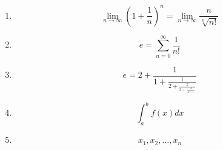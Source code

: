 \begin{enumerate}
    \item $$ \lim_{n \to \infty} \left(1 + \frac{1}{n}\right) ^ n = \lim_{n \to \infty} \frac{n}{\sqrt[n]{n!}} $$
    \item $$ e = \sum_{n = 0} ^ {\infty} \frac{1}{n!} $$
    \item $$ e = 2 + \frac{1}{1 + \frac{1}{2 + \frac{2}{3 + \frac{3}{4 + \ddots}}}} $$
    \item $$ \int_a^b f(x) dx $$ 
    \item $$ {x_1, x_2, ... , x_n} $$
\end{enumerate}